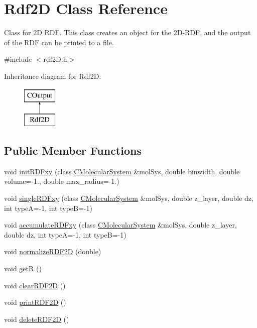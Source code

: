 \hypertarget{classRdf2D}{}\section{Rdf2D Class Reference}
\label{classRdf2D}


Class for 2D R\+DF. This class creates an object for the 2D-\/\+R\+DF, and the output of the R\+DF can be printed to a file.  




{\ttfamily \#include $<$rdf2\+D.\+h$>$}

Inheritance diagram for Rdf2D\+:\begin{figure}[H]
\begin{center}
\leavevmode
\includegraphics[height=2.000000cm]{classRdf2D}
\end{center}
\end{figure}
\subsection*{Public Member Functions}
\begin{DoxyCompactItemize}
\item 
void \mbox{\hyperlink{classRdf2D_a767f006de6412394a59f1cae5f7f6b35}{init\+R\+D\+Fxy}} (class \mbox{\hyperlink{classCMolecularSystem}{C\+Molecular\+System}} \&mol\+Sys, double binwidth, double volume=-\/1., double max\+\_\+radius=-\/1.)
\item 
void \mbox{\hyperlink{classRdf2D_afc5ff73aa9c126184e94ee3abfc14ff4}{single\+R\+D\+Fxy}} (class \mbox{\hyperlink{classCMolecularSystem}{C\+Molecular\+System}} \&mol\+Sys, double z\+\_\+layer, double dz, int typeA=-\/1, int typeB=-\/1)
\item 
void \mbox{\hyperlink{classRdf2D_a6c716851d80fd2a7dcfefd219892d87b}{accumulate\+R\+D\+Fxy}} (class \mbox{\hyperlink{classCMolecularSystem}{C\+Molecular\+System}} \&mol\+Sys, double z\+\_\+layer, double dz, int typeA=-\/1, int typeB=-\/1)
\item 
void \mbox{\hyperlink{classRdf2D_acf73dc86f20e82799157ff53994a2754}{normalize\+R\+D\+F2D}} (double)
\item 
void \mbox{\hyperlink{classRdf2D_a3c8153b303733b7e5d320f9b20f37b32}{getR}} ()
\item 
void \mbox{\hyperlink{classRdf2D_a9658a9bb2229afda0d743bdc05a27411}{clear\+R\+D\+F2D}} ()
\item 
void \mbox{\hyperlink{classRdf2D_aae00c1526117f6ac63d2c13354b6c404}{print\+R\+D\+F2D}} ()
\item 
void \mbox{\hyperlink{classRdf2D_a8008421c8aedff5887160b455879d36b}{delete\+R\+D\+F2D}} ()
\end{DoxyCompactItemize}
